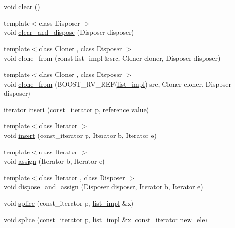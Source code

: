 \begin{DoxyCompactItemize}
\item 
void \hyperlink{classboost_1_1intrusive_1_1list__impl_a5666d7343a0e7bad0ad0f1869c90e1b2}{clear} ()
\item 
{\footnotesize template$<$class Disposer $>$ }\\void \hyperlink{classboost_1_1intrusive_1_1list__impl_a0b07cfbe98383d57a8c27a8e389c13fc}{clear\+\_\+and\+\_\+dispose} (Disposer disposer)
\item 
{\footnotesize template$<$class Cloner , class Disposer $>$ }\\void \hyperlink{classboost_1_1intrusive_1_1list__impl_afd28996ec25e7c810d7c867e66e1fa3e}{clone\+\_\+from} (const \hyperlink{classboost_1_1intrusive_1_1list__impl}{list\+\_\+impl} \&src, Cloner cloner, Disposer disposer)
\item 
{\footnotesize template$<$class Cloner , class Disposer $>$ }\\void \hyperlink{classboost_1_1intrusive_1_1list__impl_af384af26bd41d2eeecdd6fd718435888}{clone\+\_\+from} (B\+O\+O\+S\+T\+\_\+\+R\+V\+\_\+\+R\+EF(\hyperlink{classboost_1_1intrusive_1_1list__impl}{list\+\_\+impl}) src, Cloner cloner, Disposer disposer)
\item 
iterator \hyperlink{classboost_1_1intrusive_1_1list__impl_a51f571f4048e3f3e7bcb944d6f82bca0}{insert} (const\+\_\+iterator p, reference value)
\item 
{\footnotesize template$<$class Iterator $>$ }\\void \hyperlink{classboost_1_1intrusive_1_1list__impl_afabe1de903e672ab93e55782fb5f0006}{insert} (const\+\_\+iterator p, Iterator b, Iterator e)
\item 
{\footnotesize template$<$class Iterator $>$ }\\void \hyperlink{classboost_1_1intrusive_1_1list__impl_a9d29df1112a14488065cf678e4c1484a}{assign} (Iterator b, Iterator e)
\item 
{\footnotesize template$<$class Iterator , class Disposer $>$ }\\void \hyperlink{classboost_1_1intrusive_1_1list__impl_a00ddf26d859cd22fdb3b2355e8af1cd8}{dispose\+\_\+and\+\_\+assign} (Disposer disposer, Iterator b, Iterator e)
\item 
void \hyperlink{classboost_1_1intrusive_1_1list__impl_a458f433ae6990732b006544cb26f3cf2}{splice} (const\+\_\+iterator p, \hyperlink{classboost_1_1intrusive_1_1list__impl}{list\+\_\+impl} \&x)
\item 
void \hyperlink{classboost_1_1intrusive_1_1list__impl_a7d78b95611893de6779df06307a7ccb0}{splice} (const\+\_\+iterator p, \hyperlink{classboost_1_1intrusive_1_1list__impl}{list\+\_\+impl} \&x, const\+\_\+iterator new\+\_\+ele)

\end{DoxyCompactItemize}
